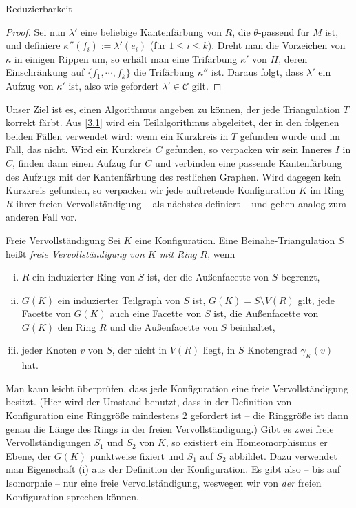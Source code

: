 \begin{section}{Reduzierbarkeit}
\begin{proof}
  Sei nun $\lambda'$ eine beliebige Kantenfärbung von $R$, die $\theta$-passend für $M$ ist, und definiere $\kappa''(f_i) := \lambda'(e_i)$ (für $1\leq i \leq k$). Dreht man die Vorzeichen von $\kappa$ in einigen Rippen um, so erhält man eine Trifärbung $\kappa'$ von $H$, deren Einschränkung auf $\{f_1,\cdots,f_k\}$ die Trifärbung $\kappa''$ ist. Daraus folgt, dass $\lambda'$ ein Aufzug von $\kappa'$ ist, also wie gefordert $\lambda' \in \mathscr{C}$ gilt. 
 \end{proof}
 
 Unser Ziel ist es, einen Algorithmus angeben zu können, der jede Triangulation $T$ korrekt färbt. Aus \ref{3.1} wird ein Teilalgorithmus abgeleitet, der in den folgenen beiden Fällen verwendet wird: wenn ein Kurzkreis in $T$ gefunden wurde und im Fall, das nicht. Wird ein Kurzkreis $C$ gefunden, so verpacken wir sein Inneres $I$ in $C$, finden dann einen Aufzug für $C$ und verbinden eine passende Kantenfärbung des Aufzugs mit der Kantenfärbung des restlichen Graphen. Wird dagegen kein Kurzkreis gefunden, so verpacken wir jede auftretende Konfiguration $K$ im Ring $R$ ihrer freien Vervollständigung -- als nächstes definiert -- und gehen analog zum anderen Fall vor. 

\begin{definition}{Freie Vervollständigung}
  Sei $K$ eine Konfiguration. Eine Beinahe-Triangulation $S$ heißt \textit{freie Vervollständigung von $K$ mit Ring $R$}, wenn
  \begin{enumerate}[(i)]
   \item $R$ ein induzierter Ring von $S$ ist, der die Außenfacette von $S$ begrenzt,
   \item $G(K)$ ein induzierter Teilgraph von $S$ ist, $G(K) = S \setminus V(R)$ gilt, jede Facette von $G(K)$ auch eine Facette von $S$ ist, die Außenfacette von $G(K)$ den Ring $R$ und die Außenfacette von $S$ beinhaltet,
   \item jeder Knoten $v$ von $S$, der nicht in $V(R)$ liegt, in $S$ Knotengrad $\gamma_K(v)$ hat.
  \end{enumerate}
 \end{definition}
 
 Man kann leicht überprüfen, dass jede Konfiguration eine freie Vervollständigung besitzt. (Hier wird der Umstand benutzt, dass in der Definition von Konfiguration eine Ringgröße mindestens $2$ gefordert ist -- die Ringgröße ist dann genau die Länge des Rings in der freien Vervollständigung.) Gibt es zwei freie Vervollständigungen $S_1$ und $S_2$ von $K$, so existiert ein Homeomorphismus er Ebene, der $G(K)$ punktweise fixiert und $S_1$ auf $S_2$ abbildet. Dazu verwendet man Eigenschaft (i) aus der Definition der Konfiguration. Es gibt also -- bis auf Isomorphie -- nur eine freie Vervollständigung, weswegen wir von \textit{der} freien Konfiguration sprechen können.
 

\end{section}
